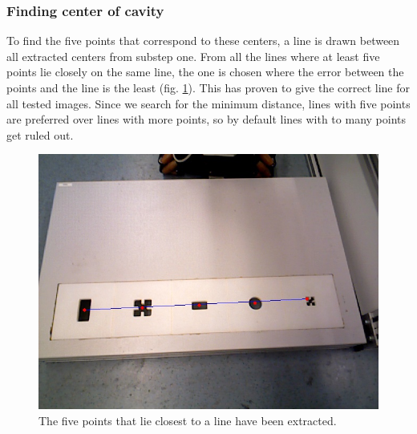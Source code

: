\documentclass{article}
\begin{document}
\subsubsection*{Finding center of cavity}
To find the five points that correspond to these centers, a line is drawn between all extracted centers from substep one. From all the lines where at least five points lie closely on the same line, the one is chosen where the error between the points and the line is the least (fig. \ref{fig:line}). This has proven to give the correct line for all tested images. Since we search for the minimum distance, lines with five points are preferred over lines with more points, so by default lines with to many points get ruled out.\\
\begin{figure}[h!]
\centering
\includegraphics[scale=0.3]{images/line.jpg}
\caption{The five points that lie closest to a line have been extracted.}
\label{fig:line}
\end{figure}
\end{document}
